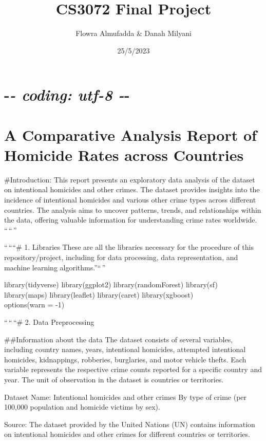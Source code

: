 \documentclass[
]{article}
\title{CS3072 Final Project}
\author{Flowra Almufadda \& Danah Milyani}
\date{25/5/2023}
\begin{document}
\maketitle

\hypertarget{coding-utf-8---}{%
\section{\texorpdfstring{-\emph{- coding: utf-8
-}-}{-\/- coding: utf-8 -\/-}}\label{coding-utf-8---}}

\hypertarget{a-comparative-analysis-report-of-homicide-rates-across-countries}{%
\section{A Comparative Analysis Report of Homicide Rates across
Countries}\label{a-comparative-analysis-report-of-homicide-rates-across-countries}}

\#Introduction: This report presents an exploratory data analysis of the
dataset on intentional homicides and other crimes. The dataset provides
insights into the incidence of intentional homicides and various other
crime types across different countries. The analysis aims to uncover
patterns, trends, and relationships within the data, offering valuable
information for understanding crime rates worldwide. ``\,``\,''

``\,````\# 1. Libraries These are all the libraries necessary for the
procedure of this repository/project, including for data processing,
data representation, and machine learning algorithms.''``\,''

library(tidyverse) library(ggplot2) library(randomForest) library(sf)
library(maps) library(leaflet) library(caret) library(xgboost)\\
options(warn = -1)

``\,``\,``\# 2. Data Preprocessing

\#\#Information about the data The dataset consists of several
variables, including country names, years, intentional homicides,
attempted intentional homicides, kidnappings, robberies, burglaries, and
motor vehicle thefts. Each variable represents the respective crime
counts reported for a specific country and year. The unit of observation
in the dataset is countries or territories.

Dataset Name: Intentional homicides and other crimes By type of crime
(per 100,000 population and homicide victims by sex).

Source: The dataset provided by the United Nations (UN) contains
information on intentional homicides and other crimes for different
countries or territories.
\end{document}
